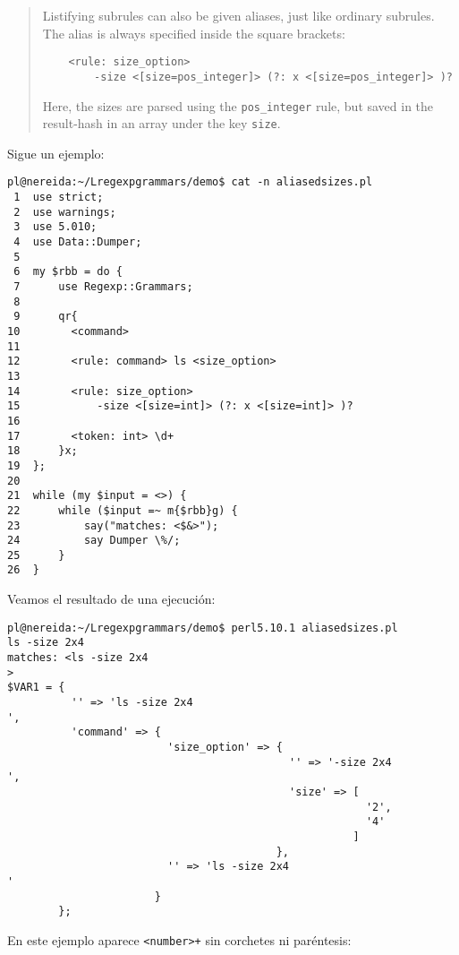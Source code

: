 
\begin{it}\begin{quotation}
Listifying subrules can also be given aliases, just like ordinary
subrules. The alias is always specified inside the square brackets:

\begin{verbatim}
    <rule: size_option>   
        -size <[size=pos_integer]> (?: x <[size=pos_integer]> )?
\end{verbatim}

Here, the sizes are parsed using the \verb|pos_integer| rule, 
but saved in the result-hash in an array under the key \verb'size'.
\end{quotation}\end{it}

Sigue un ejemplo:
\begin{verbatim}
pl@nereida:~/Lregexpgrammars/demo$ cat -n aliasedsizes.pl
 1  use strict;
 2  use warnings;
 3  use 5.010;
 4  use Data::Dumper;
 5
 6  my $rbb = do {
 7      use Regexp::Grammars;
 8
 9      qr{
10        <command>
11
12        <rule: command> ls <size_option>
13
14        <rule: size_option>
15            -size <[size=int]> (?: x <[size=int]> )?
16
17        <token: int> \d+
18      }x;
19  };
20
21  while (my $input = <>) {
22      while ($input =~ m{$rbb}g) {
23          say("matches: <$&>");
24          say Dumper \%/;
25      }
26  }
\end{verbatim}
Veamos el resultado de una ejecución:
\begin{verbatim}
pl@nereida:~/Lregexpgrammars/demo$ perl5.10.1 aliasedsizes.pl
ls -size 2x4
matches: <ls -size 2x4
>
$VAR1 = {
          '' => 'ls -size 2x4
',
          'command' => {
                         'size_option' => {
                                            '' => '-size 2x4
',
                                            'size' => [
                                                        '2',
                                                        '4'
                                                      ]
                                          },
                         '' => 'ls -size 2x4
'
                       }
        };
\end{verbatim}


En este ejemplo aparece \verb|<number>+| sin 
corchetes ni paréntesis:

